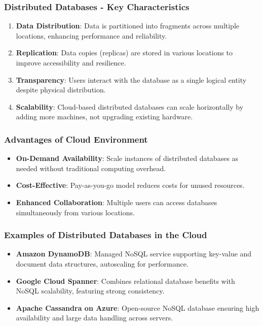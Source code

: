 \documentclass[aspectratio=169]{beamer}
\begin{document}
\begin{frame}[fragile]
    \frametitle{Distributed Databases - Key Characteristics}
    \begin{enumerate}
        \item \textbf{Data Distribution}: Data is partitioned into fragments across multiple locations, enhancing performance and reliability.
        \item \textbf{Replication}: Data copies (replicas) are stored in various locations to improve accessibility and resilience.
        \item \textbf{Transparency}: Users interact with the database as a single logical entity despite physical distribution.
        \item \textbf{Scalability}: Cloud-based distributed databases can scale horizontally by adding more machines, not upgrading existing hardware.
    \end{enumerate}
\end{frame}

\begin{frame}[fragile]
    \frametitle{Advantages of Cloud Environment}
    \begin{itemize}
        \item \textbf{On-Demand Availability}: Scale instances of distributed databases as needed without traditional computing overhead.
        \item \textbf{Cost-Effective}: Pay-as-you-go model reduces costs for unused resources.
        \item \textbf{Enhanced Collaboration}: Multiple users can access databases simultaneously from various locations.
    \end{itemize}
\end{frame}

\begin{frame}[fragile]
    \frametitle{Examples of Distributed Databases in the Cloud}
    \begin{itemize}
        \item \textbf{Amazon DynamoDB}: Managed NoSQL service supporting key-value and document data structures, autoscaling for performance.
        \item \textbf{Google Cloud Spanner}: Combines relational database benefits with NoSQL scalability, featuring strong consistency.
        \item \textbf{Apache Cassandra on Azure}: Open-source NoSQL database ensuring high availability and large data handling across servers.
    \end{itemize}
\end{frame}
\end{document}
